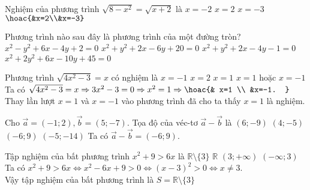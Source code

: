 \begin{ex}%
	Nghiệm của phương trình $\sqrt{8-x^2}=\sqrt{x+2}$ là
	\choice
	{$x=-2$}
	{\True $x=2$}
	{$x=-3$}
	{$\hoac{&x=2\\&x=-3}$}
\end{ex}
\begin{ex}%
	Phương trình nào sau đây là phương trình của một đường tròn?
	\choice
	{$x^2-y^2+6x-4y+2=0$}
	{$x^2+y^2+2x-6y+20=0$}
	{\True $x^2+y^2+2x-4y-1=0$}
	{$x^2+2y^2+6x-10y+45=0$}
\end{ex}
\begin{ex}%
	Phương trình $\sqrt{4x^2-3}=x$ có nghiệm là
	\choice
	{$x=-1$}
	{$x=2$}
	{\True $x=1$}
	{$x=1$ hoặc $x=-1$}
	\loigiai
	{
		Ta có $\sqrt{4x^2-3}=x\Rightarrow 3x^2-3=0\Rightarrow x^2=1\Rightarrow \hoac{& x=1 \\ &x=-1. }$\\
		Thay lần lượt $x=1$ và $x=-1$ vào phương trình đã cho ta thấy $x=1$ là nghiệm.
	}
\end{ex}
\begin{ex}%
	Cho $\vec{a}=(-1 ; 2), \vec{b}=(5 ;-7)$. Tọa độ của véc-tơ $\vec{a}-\vec{b}$ là
	\choice
	{ $(6 ;-9)$}
	{ $(4 ;-5)$}
	{\True $(-6 ; 9)$}
	{ $(-5 ;-14)$}
	\loigiai
	{
		Ta có $\vec{a}-\vec{b}=(-6 ; 9)$.
	}
\end{ex}
\begin{ex}%
	Tập nghiệm của bất phương trình $x^2+9>6x$ là
	\choice
	{\True $\mathbb{R} \setminus \{3\}$}
	{$\mathbb{R}$}
	{ $(3 ;+\infty)$}
	{ $(-\infty ; 3)$}
	\loigiai
	{
		Ta có $x^2+9>6x \Leftrightarrow x^2-6x+9>0\Leftrightarrow (x-3)^2>0\Leftrightarrow x\ne 3$.\\
		Vậy tập nghiệm của bất phương trình là $S=\mathbb{R} \setminus \{3\}$
	}
\end{ex}
